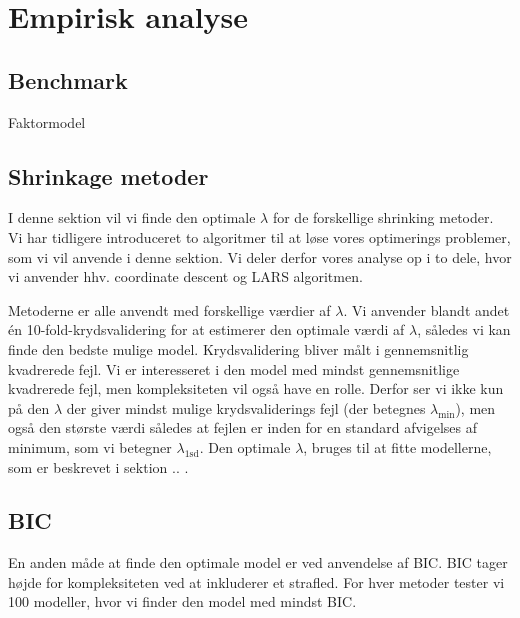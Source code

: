\chapter{Empirisk analyse}
 
\section{Benchmark}
Faktormodel


\section{Shrinkage metoder}
I denne sektion vil vi finde den optimale $\lambda$ for de forskellige shrinking metoder. 
Vi har tidligere introduceret to algoritmer til at løse vores optimerings problemer, som vi vil anvende i denne sektion.
Vi deler derfor vores analyse op i to dele, hvor vi anvender hhv. coordinate descent og LARS algoritmen.

Metoderne er alle anvendt med forskellige værdier af $\lambda$. 
Vi anvender blandt andet én 10-fold-krydsvalidering for at estimerer den optimale værdi af $\lambda$, således vi kan finde den bedste mulige model. 
Krydsvalidering bliver målt i gennemsnitlig kvadrerede fejl. 
Vi er interesseret i den model med mindst gennemsnitlige kvadrerede fejl, men kompleksiteten vil også have en rolle.
Derfor ser vi ikke kun på den $\lambda$ der giver mindst mulige krydsvaliderings fejl (der betegnes $\lambda_{\min}$), men også den største værdi således at fejlen er inden for en standard afvigelses af minimum, som vi betegner $\lambda_{\text{1sd}}$.  
Den optimale $\lambda$, bruges til at fitte modellerne, som er beskrevet i sektion .. .  





\section{BIC}
En anden måde at finde den optimale model er ved anvendelse af BIC. 
BIC tager højde for kompleksiteten ved at inkluderer et strafled.
For hver metoder tester vi 100 modeller, hvor vi finder den model med mindst BIC. 

